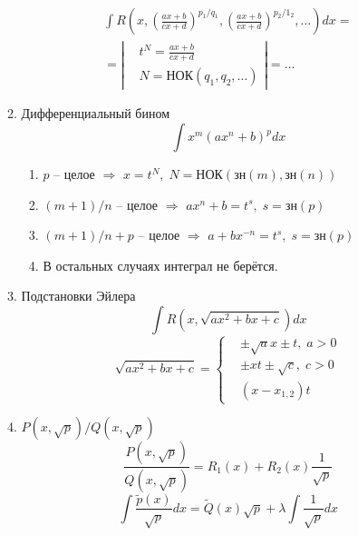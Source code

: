 \documentclass{article}
\newcommand{\x}{\text}
\begin{document}
\begin{itemize}
\begin{enumerate}
                    \begin{multline*}
                        \int R\left(x, \left(\frac{ax + b}{cx+d}\right)^{p_1/q_1}, \left(\frac{ax + b}{cx+ d}\right)^{p_2/1_2}, \ldots \right)dx = \\ = \left|
                        \begin{aligned}
                             & t^N = \frac{ax+b}{cx+d}       \\
                             & N = \x{НОК}(q_1, q_2, \ldots)
                        \end{aligned} \right| = \ldots
                    \end{multline*}
              \item Дифференциальный бином
                    $$ \int x^m (ax^n+b)^pdx $$
                    \begin{enumerate}
                        \item $p$ -- целое $\Rightarrow$ $x = t^N, \; N = \x{НОК}(\x{зн}(m), \x{зн}(n))$
                        \item $(m+1)/{n}$ -- целое $\Rightarrow$ $ax^n+b = t^s, \; s=\x{зн}(p)$
                        \item ${(m+1)}/{n}+p$ -- целое $\Rightarrow$ $a + b x^{-n} = t^s, \; s=\x{зн}(p)$
                        \item В остальных случаях интеграл не берётся.
                    \end{enumerate}
              \item Подстановки Эйлера
                    $$ \int R\left(x, \sqrt{ax^2+bx+c}\right)dx $$
                    \begin{equation*}
                        \sqrt{ax^2+bx+c} = \left\{
                        \begin{aligned}
                             & \pm \sqrt{a}x \pm t, \; a > 0 \\
                             & \pm xt \pm \sqrt{c}, \; c > 0 \\
                             & (x-x_{1,2})t
                        \end{aligned}
                        \right.
                    \end{equation*}
              \item $P(x, \sqrt{p})/Q(x, \sqrt{p})$
                    $$ \frac{P(x, \sqrt{p})}{Q(x, \sqrt{p})} = R_1(x) + R_2(x) \frac{1}{\sqrt{p}} $$
                    $$ \int\frac{\widetilde{p}(x)}{\sqrt{p}}dx = \widetilde{Q}(x)\sqrt{p} + \lambda\int\frac{1}{\sqrt{p}}dx $$

\end{enumerate}
\end{itemize}
\end{document}
